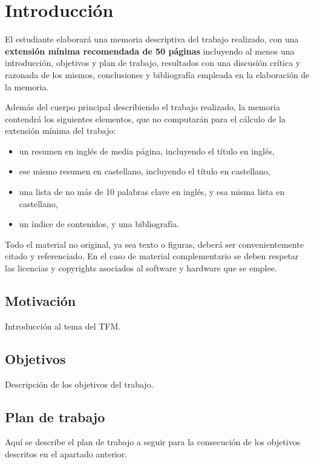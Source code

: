 
\chapter{Introducción}
\label{cap:introduccion}



El estudiante elaborará una memoria descriptiva del trabajo realizado, con una \textbf{extensión mínima recomendada de 50 páginas} incluyendo al menos una introducción, objetivos y plan de trabajo, resultados con una discusión crítica y razonada de los mismos, conclusiones y bibliografía empleada en la elaboración de la memoria.

Además del cuerpo principal describiendo el trabajo realizado, la memoria contendrá los siguientes elementos, que no computarán para el cálculo de la extensión mínima del trabajo:

\begin{itemize}
\item un resumen en inglés de media página, incluyendo el título en inglés,
\item ese mismo resumen en castellano, incluyendo el título en castellano,
\item una lista de no más de 10 palabras clave en inglés, y esa misma lista en castellano,
\item un índice de contenidos, y una bibliografía.
\end{itemize}

Todo el material no original, ya sea texto o figuras, deberá ser convenientemente citado y referenciado. En el caso de material complementario se deben respetar las licencias y copyrights asociados al software y hardware que se emplee.


\section{Motivación}
Introducción al tema del TFM.


\section{Objetivos}
Descripción de los objetivos del trabajo.


\section{Plan de trabajo}
Aquí se describe el plan de trabajo a seguir para la consecución de los objetivos descritos en el apartado anterior.

